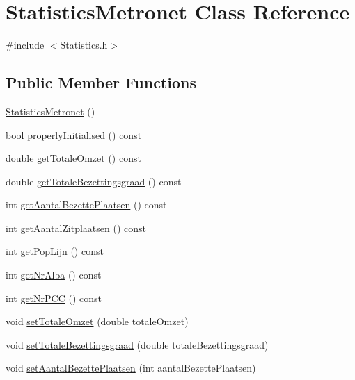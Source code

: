 \hypertarget{class_statistics_metronet}{}\section{Statistics\+Metronet Class Reference}
\label{class_statistics_metronet}


{\ttfamily \#include $<$Statistics.\+h$>$}

\subsection*{Public Member Functions}
\begin{DoxyCompactItemize}
\item 
\hyperlink{class_statistics_metronet_abeb5606c7be71604b5a3e7a8c9df4f56}{Statistics\+Metronet} ()
\item 
bool \hyperlink{class_statistics_metronet_a4e64c7cf04e21b9f018e4b41d6118ba5}{properly\+Initialised} () const 
\item 
double \hyperlink{class_statistics_metronet_a9c8271d547233dfdda7f604582f26427}{get\+Totale\+Omzet} () const 
\item 
double \hyperlink{class_statistics_metronet_ac60ef8d46a8ab51f3c4da67a67c25a17}{get\+Totale\+Bezettingsgraad} () const 
\item 
int \hyperlink{class_statistics_metronet_a89923c8ba0f4276a73e4ace0e542227b}{get\+Aantal\+Bezette\+Plaatsen} () const 
\item 
int \hyperlink{class_statistics_metronet_a3a4666b6425541f847d9428713f3c370}{get\+Aantal\+Zitplaatsen} () const 
\item 
int \hyperlink{class_statistics_metronet_a8f8b8e5011f5387a969cdb0d972096b7}{get\+Pop\+Lijn} () const 
\item 
int \hyperlink{class_statistics_metronet_a0f80bdf014fe078a0748eeec515e0831}{get\+Nr\+Alba} () const 
\item 
int \hyperlink{class_statistics_metronet_ae9d5c297c369e8480447e3e6ffa6c0a5}{get\+Nr\+P\+CC} () const 
\item 
void \hyperlink{class_statistics_metronet_a84d1ec559861a5248975ce06bca06d0c}{set\+Totale\+Omzet} (double totale\+Omzet)
\item 
void \hyperlink{class_statistics_metronet_a15b6e570cd719ac575b513f499154dbc}{set\+Totale\+Bezettingsgraad} (double totale\+Bezettingsgraad)
\item 
void \hyperlink{class_statistics_metronet_a595b51e0e2ab976cd162e429f1c897dd}{set\+Aantal\+Bezette\+Plaatsen} (int aantal\+Bezette\+Plaatsen)

\end{DoxyCompactItemize}
